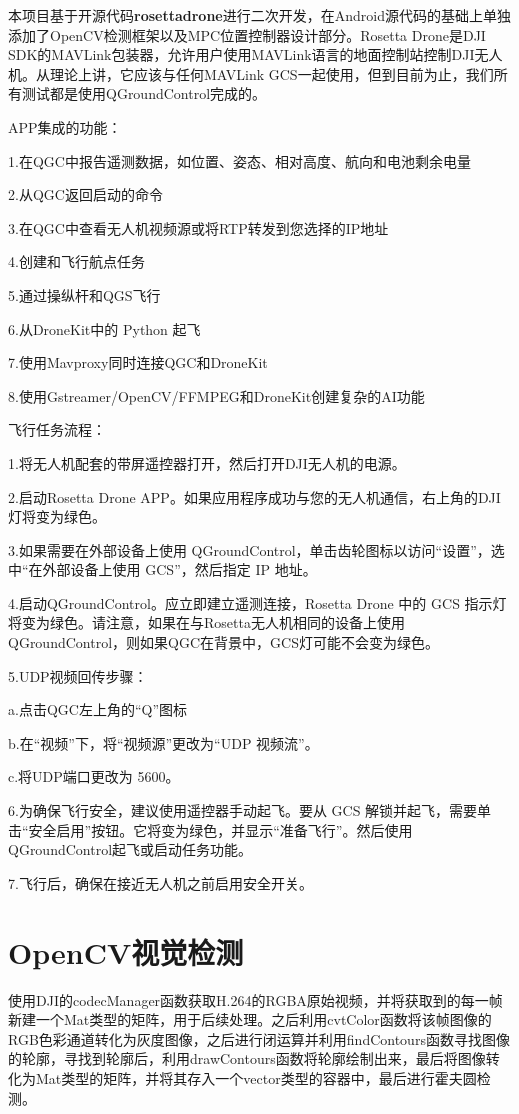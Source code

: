 本项目基于开源代码\textbf{rosettadrone}进行二次开发，在Android源代码的基础上单独添加了OpenCV检测框架以及MPC位置控制器设计部分\cite{ArtE11}。Rosetta Drone是DJI SDK的MAVLink包装器，允许用户使用MAVLink语言的地面控制站控制DJI无人机。从理论上讲，它应该与任何MAVLink GCS一起使用，但到目前为止，我们所有测试都是使用QGroundControl完成的。\cite{Net1}

APP集成的功能：

1.在QGC中报告遥测数据，如位置、姿态、相对高度、航向和电池剩余电量

2.从QGC返回启动的命令

3.在QGC中查看无人机视频源或将RTP转发到您选择的IP地址

4.创建和飞行航点任务

5.通过操纵杆和QGS飞行

6.从DroneKit中的 Python 起飞

7.使用Mavproxy同时连接QGC和DroneKit

8.使用Gstreamer/OpenCV/FFMPEG和DroneKit创建复杂的AI功能

飞行任务流程：

1.将无人机配套的带屏遥控器打开，然后打开DJI无人机的电源。

2.启动Rosetta Drone APP。如果应用程序成功与您的无人机通信，右上角的DJI灯将变为绿色。

3.如果需要在外部设备上使用 QGroundControl，单击齿轮图标以访问“设置”，选中“在外部设备上使用 GCS”，然后指定 IP 地址。

4.启动QGroundControl。应立即建立遥测连接，Rosetta Drone 中的 GCS 指示灯将变为绿色。请注意，如果在与Rosetta无人机相同的设备上使用QGroundControl，则如果QGC在背景中，GCS灯可能不会变为绿色。

5.UDP视频回传步骤：

a.点击QGC左上角的“Q”图标

b.在“视频”下，将“视频源”更改为“UDP 视频流”。

c.将UDP端口更改为 5600。

6.为确保飞行安全，建议使用遥控器手动起飞。要从 GCS 解锁并起飞，需要单击“安全启用”按钮。它将变为绿色，并显示“准备飞行”。然后使用QGroundControl起飞或启动任务功能。

7.飞行后，确保在接近无人机之前启用安全开关。

\section{OpenCV视觉检测}

使用DJI的codecManager函数获取H.264的RGBA原始视频，并将获取到的每一帧新建一个Mat类型的矩阵，用于后续处理。之后利用cvtColor函数将该帧图像的RGB色彩通道转化为灰度图像，之后进行闭运算并利用findContours函数寻找图像的轮廓，寻找到轮廓后，利用drawContours函数将轮廓绘制出来，最后将图像转化为Mat类型的矩阵，并将其存入一个vector类型的容器中，最后进行霍夫圆检测。


